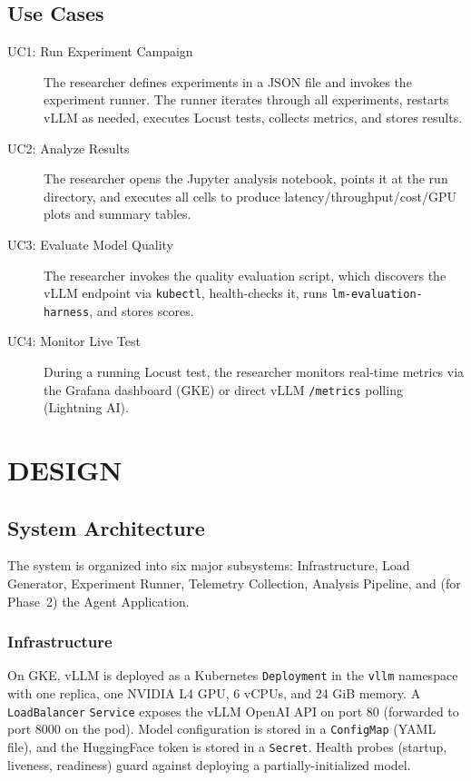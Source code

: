 \documentclass[a4paper,12pt]{report}
\begin{document}
\section{Use Cases}

\begin{description}
    \item[UC1: Run Experiment Campaign] The researcher defines experiments in a JSON file and invokes the experiment runner. The runner iterates through all experiments, restarts vLLM as needed, executes Locust tests, collects metrics, and stores results.
    \item[UC2: Analyze Results] The researcher opens the Jupyter analysis notebook, points it at the run directory, and executes all cells to produce latency/throughput/cost/GPU plots and summary tables.
    \item[UC3: Evaluate Model Quality] The researcher invokes the quality evaluation script, which discovers the vLLM endpoint via \texttt{kubectl}, health-checks it, runs \texttt{lm-evaluation-harness}, and stores scores.
    \item[UC4: Monitor Live Test] During a running Locust test, the researcher monitors real-time metrics via the Grafana dashboard (GKE) or direct vLLM \texttt{/metrics} polling (Lightning AI).
\end{description}

\chapter{DESIGN}

\section{System Architecture}

The system is organized into six major subsystems: Infrastructure, Load Generator, Experiment Runner, Telemetry Collection, Analysis Pipeline, and (for Phase~2) the Agent Application.

\subsection{Infrastructure}

On GKE, vLLM is deployed as a Kubernetes \texttt{Deployment} in the \texttt{vllm} namespace with one replica, one NVIDIA L4 GPU, 6 vCPUs, and 24 GiB memory. A \texttt{LoadBalancer} \texttt{Service} exposes the vLLM OpenAI API on port 80 (forwarded to port 8000 on the pod). Model configuration is stored in a \texttt{ConfigMap} (YAML file), and the HuggingFace token is stored in a \texttt{Secret}. Health probes (startup, liveness, readiness) guard against deploying a partially-initialized model.
\end{document}
